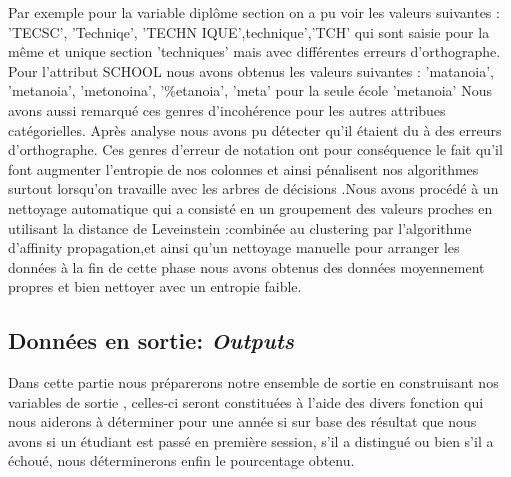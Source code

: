 Par exemple pour la variable diplôme section on a pu voir les valeurs suivantes : 'TECSC', 'Techniqe',
'TECHN IQUE',technique','TCH' qui sont saisie pour la même et unique
section 'techniques' mais avec différentes erreurs d'orthographe. \\
Pour l'attribut SCHOOL nous avons obtenus les valeurs suivantes :
'matanoia', 'metanoia', 'metonoina', '\%etanoia', 'meta' pour la seule école 'metanoia'
Nous avons aussi remarqué ces genres d'incohérence pour les autres attribues catégorielles.  
Après analyse nous avons pu détecter qu'il étaient  du à des erreurs d'orthographe.
Ces genres d'erreur de notation ont pour conséquence le fait qu'il font
augmenter l'entropie de nos colonnes et ainsi pénalisent nos algorithmes
surtout lorsqu'on travaille avec les arbres de décisions .Nous avons
procédé à un nettoyage automatique qui a consisté en un groupement des
valeurs proches en utilisant la distance de Leveinstein :\cite{LevStack}combinée au  clustering par l'algorithme d'affinity propagation,et
ainsi qu'un nettoyage manuelle pour arranger les données à la fin de
cette phase nous avons obtenus des données moyennement propres et bien
nettoyer avec un entropie faible.
 \subsection{Données en sortie: \emph{Outputs}}

 Dans cette partie nous préparerons notre ensemble de sortie en
 construisant nos variables de sortie , celles-ci seront constituées à
 l'aide des divers fonction qui nous aiderons à déterminer pour une année
 si sur base des résultat que nous avons si un étudiant est passé en
 première session, s'il a distingué ou bien s'il a échoué, nous
 déterminerons enfin le pourcentage obtenu.
 
